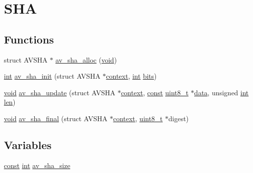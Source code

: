 \hypertarget{group__lavu__sha}{}\section{S\+HA}
\label{group__lavu__sha}
\subsection*{Functions}
\begin{DoxyCompactItemize}
\item 
struct A\+V\+S\+HA $\ast$ \hyperlink{group__lavu__sha_ga58c5632adf76c34993e509b3464496c5}{av\+\_\+sha\+\_\+alloc} (\hyperlink{sound_8c_ae35f5844602719cf66324f4de2a658b3}{void})
\item 
\hyperlink{xmltok_8h_a5a0d4a5641ce434f1d23533f2b2e6653}{int} \hyperlink{group__lavu__sha_gaf53a37af454b04d4974861e931593e1a}{av\+\_\+sha\+\_\+init} (struct A\+V\+S\+HA $\ast$\hyperlink{structcontext}{context}, \hyperlink{xmltok_8h_a5a0d4a5641ce434f1d23533f2b2e6653}{int} \hyperlink{metrics_8c_a1eb8fc809d37cc6176f7f27374b063d0}{bits})
\item 
\hyperlink{sound_8c_ae35f5844602719cf66324f4de2a658b3}{void} \hyperlink{group__lavu__sha_ga26dd7f8bf7d33ed7f4d8cbcc881e3579}{av\+\_\+sha\+\_\+update} (struct A\+V\+S\+HA $\ast$\hyperlink{structcontext}{context}, \hyperlink{getopt1_8c_a2c212835823e3c54a8ab6d95c652660e}{const} \hyperlink{lib-src_2ffmpeg_2win32_2stdint_8h_a9a941819355e6f658991890ff66b4b0e}{uint8\+\_\+t} $\ast$\hyperlink{lib_2expat_8h_ac39e72a1de1cb50dbdc54b08d0432a24}{data}, unsigned \hyperlink{xmltok_8h_a5a0d4a5641ce434f1d23533f2b2e6653}{int} \hyperlink{lib_2expat_8h_af86d325fecfc8f47b61fbf5a5146f582}{len})
\item 
\hyperlink{sound_8c_ae35f5844602719cf66324f4de2a658b3}{void} \hyperlink{group__lavu__sha_gadc0f2ed085f24f10cacfcdfcfc2e0127}{av\+\_\+sha\+\_\+final} (struct A\+V\+S\+HA $\ast$\hyperlink{structcontext}{context}, \hyperlink{lib-src_2ffmpeg_2win32_2stdint_8h_a9a941819355e6f658991890ff66b4b0e}{uint8\+\_\+t} $\ast$digest)
\end{DoxyCompactItemize}
\subsection*{Variables}
\begin{DoxyCompactItemize}
\item 
\hyperlink{getopt1_8c_a2c212835823e3c54a8ab6d95c652660e}{const} \hyperlink{xmltok_8h_a5a0d4a5641ce434f1d23533f2b2e6653}{int} \hyperlink{group__lavu__sha_ga622be70e89326cc46029bf4f130be825}{av\+\_\+sha\+\_\+size}
\end{DoxyCompactItemize}


